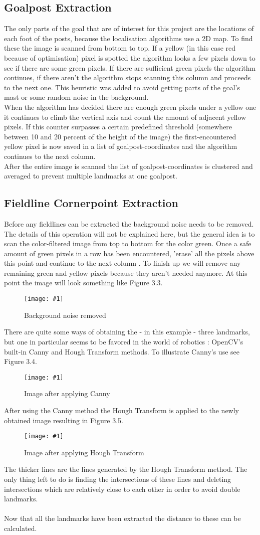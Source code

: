 \documentclass{ba-kecs}
\numberwithin{figure}{section}
\numberwithin{equation}{section}
\newcommand{\dkepic}[2]{ %
	\begin{figure}[H] %
	\texttt{[image: \#1]}
	\caption{#2}
	\label{#1}
	\end{figure}
}
\begin{document}
\subsection{Goalpost Extraction}
The only parts of the goal that are of interest for this project are the locations of each foot of the posts, because the localisation algorithms use a 2D map. To find these the image is scanned from bottom to top. If a yellow (in this case red because of optimisation) pixel is spotted the algorithm looks a few pixels down to see if there are some green pixels. If there are sufficient green pixels the algorithm continues, if there aren't the algorithm stops scanning this column and proceeds to the next one. This heuristic was added to avoid getting parts of the goal's mast or some random noise in the background.\\
When the algorithm has decided there are enough green pixels under a yellow one it continues to climb the vertical axis and count the amount of adjacent yellow pixels. If this counter surpasses a certain predefined threshold (somewhere between 10 and 20 percent of the height of the image) the first-encountered yellow pixel is now saved in a list of goalpost-coordinates and the algorithm continues to the next column.\\
After the entire image is scanned the list of goalpost-coordinates is clustered and averaged to prevent multiple landmarks at one goalpost.

\subsection{Fieldline Cornerpoint Extraction}
Before any fieldlines can be extracted the background noise needs to be removed. The details of this operation will not be explained here, but the general idea is to scan the color-filtered image from top to bottom for the color green. Once a safe amount of green pixels in a row has been encountered, 'erase' all the pixels above this point and continue to the next column \cite{ref1}. To finish up we will remove any remaining green and yellow pixels because they aren't needed anymore. At this point the image will look something like Figure 3.3.\\
\dkepic{figure_IP3}{Background noise removed}
There are quite some ways of obtaining the - in this example - three landmarks, but one in particular seems to be favored in the world of robotics \cite{ref2}\cite{ref3}: OpenCV's built-in Canny and Hough Transform methods. To illustrate Canny's use see Figure 3.4.\\
\dkepic{figure_IP4}{Image after applying Canny}
After using the Canny method the Hough Transform is applied to the newly obtained image resulting in Figure 3.5.\\
\dkepic{figure_IP5}{Image after applying Hough Transform}
The thicker lines are the lines generated by the Hough Transform method. The only thing left to do is finding the intersections of these lines and deleting intersections which are relatively close to each other in order to avoid double landmarks.\\ \\
Now that all the landmarks have been extracted the distance to these can be calculated.
\end{document}
